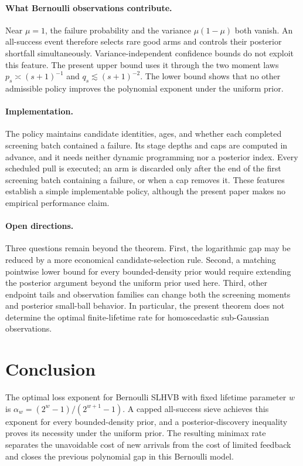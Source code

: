 \documentclass[11pt,letterpaper]{article}
\numberwithin{equation}{section}
\theoremstyle{definition}
\theoremstyle{remark}
\newcommand{\1}{\mathbf{1}}
\begin{document}
\paragraph{What Bernoulli observations contribute.}
Near $\mu=1$, the failure probability and the variance
$\mu(1-\mu)$ both vanish. An all-success event therefore selects
rare good arms and controls their posterior shortfall simultaneously.
Variance-independent confidence bounds do not exploit this feature.
The present upper bound uses it through the two moment laws
$p_s\asymp(s+1)^{-1}$ and $q_s\lesssim(s+1)^{-2}$.
The lower bound shows that no other admissible policy improves the
polynomial exponent under the uniform prior.

\paragraph{Implementation.}
The policy maintains candidate identities, ages, and whether each
completed screening batch contained a failure. Its stage depths and
caps are computed in advance, and it needs neither dynamic programming
nor a posterior index. Every scheduled pull is executed; an arm is
discarded only after the end of the first screening batch containing
a failure, or when a cap removes it. These features establish a
simple implementable policy, although the present paper makes no
empirical performance claim.

\paragraph{Open directions.}
Three questions remain beyond the theorem. First, the logarithmic
gap may be reduced by a more economical candidate-selection rule.
Second, a matching pointwise lower bound for every bounded-density
prior would require extending the posterior argument beyond the
uniform prior used here. Third, other endpoint tails and observation
families can change both the screening moments and posterior
small-ball behavior. In particular, the present theorem does not
determine the optimal finite-lifetime rate for homoscedastic
sub-Gaussian observations.

\section{Conclusion}

The optimal loss exponent for Bernoulli SLHVB with fixed lifetime
parameter $w$ is
$\alpha_w=(2^w-1)/(2^{w+1}-1)$.
A capped all-success sieve achieves this exponent for every
bounded-density prior, and a posterior-discovery inequality proves
its necessity under the uniform prior. The resulting minimax rate
separates the unavoidable cost of new arrivals from the cost of
limited feedback and closes the previous polynomial gap in this
Bernoulli model.
\end{document}
